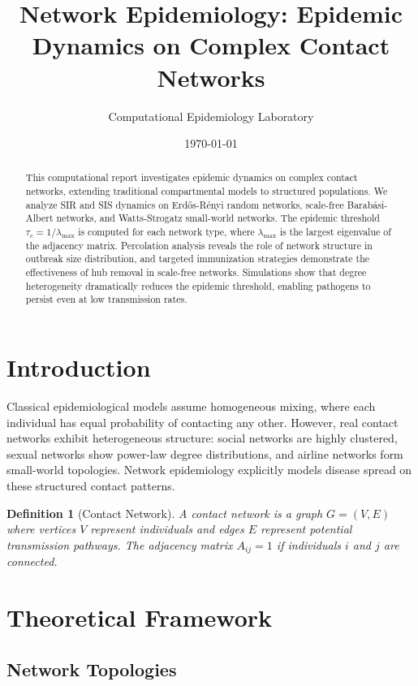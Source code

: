\documentclass[a4paper, 11pt]{article}
\title{Network Epidemiology: Epidemic Dynamics on Complex Contact Networks}
\author{Computational Epidemiology Laboratory}
\date{\today}
\newtheorem{definition}{Definition}[section]
\begin{document}
\maketitle

\begin{abstract}
This computational report investigates epidemic dynamics on complex contact networks,
extending traditional compartmental models to structured populations. We analyze SIR
and SIS dynamics on Erdős-Rényi random networks, scale-free Barabási-Albert networks,
and Watts-Strogatz small-world networks. The epidemic threshold $\tau_c = 1/\lambda_{\max}$
is computed for each network type, where $\lambda_{\max}$ is the largest eigenvalue of
the adjacency matrix. Percolation analysis reveals the role of network structure in
outbreak size distribution, and targeted immunization strategies demonstrate the
effectiveness of hub removal in scale-free networks. Simulations show that degree
heterogeneity dramatically reduces the epidemic threshold, enabling pathogens to persist
even at low transmission rates.
\end{abstract}

\section{Introduction}

Classical epidemiological models assume homogeneous mixing, where each individual has
equal probability of contacting any other. However, real contact networks exhibit
heterogeneous structure: social networks are highly clustered, sexual networks show
power-law degree distributions, and airline networks form small-world topologies. Network
epidemiology explicitly models disease spread on these structured contact patterns.

\begin{definition}[Contact Network]
A contact network is a graph $G = (V, E)$ where vertices $V$ represent individuals and
edges $E$ represent potential transmission pathways. The adjacency matrix $A_{ij} = 1$
if individuals $i$ and $j$ are connected.
\end{definition}

\section{Theoretical Framework}

\subsection{Network Topologies}
\end{document}
